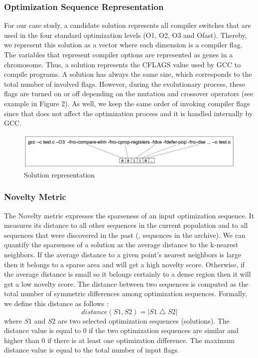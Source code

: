 \subsubsection{Optimization Sequence Representation}
For our case study, a candidate solution represents all compiler switches that are used in the four standard optimization levels (O1, O2, O3 and Ofast). Thereby, we represent this solution as a vector where each dimension is a compiler flag. 
The variables that represent compiler options are represented as genes in a chromosome. 
Thus, a solution represents the CFLAGS value used by GCC to compile programs.
A solution has always the same size, which corresponds to the total number of involved flags. 
However, during the evolutionary process, these flags are turned on or off depending on the mutation and crossover operators (see example in Figure 2). As well, we keep the same order of invoking compiler flags since that does not affect the optimization process and it is handled internally by GCC.
\begin{figure}[h]
	\centering
	\includegraphics[width=1\hsize]{chapitre3/fig/individual.png}
	\caption{Solution representation}
	
\end{figure}

\subsubsection{Novelty Metric}
The Novelty metric expresses the sparseness of an input optimization sequence. It measures its distance to all other sequences in the current population and to all sequences that were discovered in the past (\ie, sequences in the archive). 
We can quantify the sparseness of a solution as the average distance to the k-nearest neighbors. 
If the average distance to a given point's nearest neighbors is large then it belongs to a sparse area and will get a high novelty score. 
Otherwise, if the average distance is small so it belongs certainly to a dense region then it will get a low novelty score. 
The distance between two sequences is computed as the total number of symmetric differences among optimization sequences. Formally, we define this distance as follows :
\begin{equation}
distance(S1,S2)=\left | S1 \bigtriangleup S2 \right |
\end{equation}
where $S1$ and $S2$ are two selected optimization sequences (solutions). The distance value is equal to 0 if the two optimization sequences are similar and higher than 0 if there is at least one optimization difference. The maximum distance value is equal to the total number of input flags.

